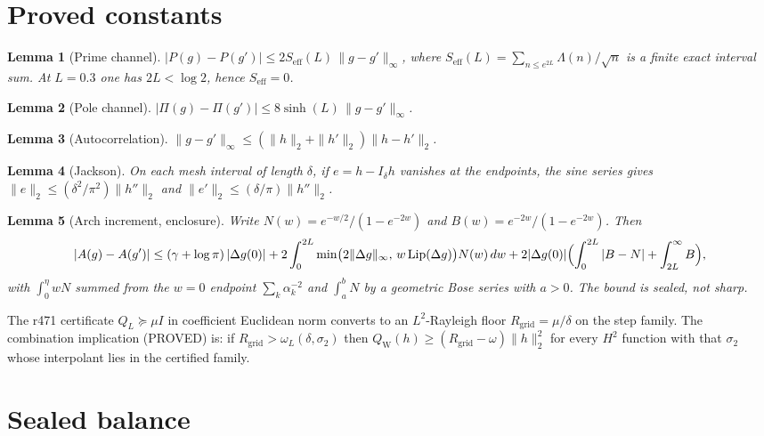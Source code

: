 \documentclass[11pt]{article}
\newtheorem{lemma}{Lemma}
\theoremstyle{remark}
\newcommand{\QW}{Q_{\mathrm W}}
\begin{document}
\section{Proved constants}

\begin{lemma}[Prime channel]\label{lem:P}
$|P(g)-P(g')|\le 2S_{\mathrm{eff}}(L)\,\|g-g'\|_\infty$, where
$S_{\mathrm{eff}}(L)=\sum_{n\le e^{2L}}\Lambda(n)/\sqrt n$
is a finite exact interval sum.  At $L=0.3$ one has $2L<\log2$,
hence $S_{\mathrm{eff}}=0$.
\end{lemma}

\begin{lemma}[Pole channel]\label{lem:Pi}
$|\Pi(g)-\Pi(g')|\le 8\sinh(L)\,\|g-g'\|_\infty$.
\end{lemma}

\begin{lemma}[Autocorrelation]\label{lem:g}
$\|g-g'\|_\infty\le(\|h\|_2+\|h'\|_2)\|h-h'\|_2$.
\end{lemma}

\begin{lemma}[Jackson]\label{lem:J}
On each mesh interval of length $\delta$, if $e=h-I_\delta h$
vanishes at the endpoints, the sine series gives
$\|e\|_2\le(\delta^2/\pi^2)\|h''\|_2$ and
$\|e'\|_2\le(\delta/\pi)\|h''\|_2$.
\end{lemma}

\begin{lemma}[Arch increment, enclosure]\label{lem:A}
Write $N(w)=e^{-w/2}/(1-e^{-2w})$ and
$B(w)=e^{-2w}/(1-e^{-2w})$.  Then
\[
 |A(g)-A(g')|
 \le(\gamma+\log\pi)\,|\Delta g(0)|
 +2\int_0^{2L}\min\bigl(2\|\Delta g\|_\infty,\,w\,\mathrm{Lip}(\Delta g)\bigr)
   N(w)\,dw
 +2|\Delta g(0)|\Bigl(\int_0^{2L}|B-N|
 +\int_{2L}^\infty B\Bigr),
\]
with $\int_0^\eta w N$ summed from the $w=0$ endpoint
$\sum_k\alpha_k^{-2}$ and $\int_a^b N$ by a geometric Bose series
with $a>0$.  The bound is sealed, not sharp.
\end{lemma}

The r471 certificate $Q_L\succeq\mu I$ in coefficient Euclidean
norm converts to an $L^2$-Rayleigh floor $R_{\mathrm{grid}}=\mu/\delta$
on the step family.  The combination implication (PROVED) is: if
$R_{\mathrm{grid}}>\omega_L(\delta,\sigma_2)$ then
$\QW(h)\ge(R_{\mathrm{grid}}-\omega)\|h\|_2^2$ for every $H^2$ function
with that $\sigma_2$ whose interpolant lies in the certified family.

\section{Sealed balance}
\end{document}
